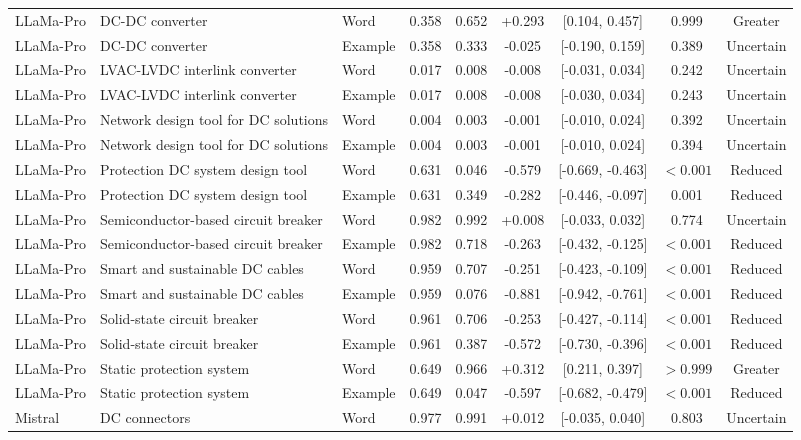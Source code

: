 \begin{landscape}
\begin{longtable}{lllcccccc}
LLaMa-Pro & DC-DC converter & Word & 0.358 & 0.652 & +0.293 & [0.104, 0.457] & 0.999 & Greater \\
LLaMa-Pro & DC-DC converter & Example & 0.358 & 0.333 & -0.025 & [-0.190, 0.159] & 0.389 & Uncertain \\
LLaMa-Pro & LVAC-LVDC interlink converter & Word & 0.017 & 0.008 & -0.008 & [-0.031, 0.034] & 0.242 & Uncertain \\
LLaMa-Pro & LVAC-LVDC interlink converter & Example & 0.017 & 0.008 & -0.008 & [-0.030, 0.034] & 0.243 & Uncertain \\
LLaMa-Pro & Network design tool for DC solutions & Word & 0.004 & 0.003 & -0.001 & [-0.010, 0.024] & 0.392 & Uncertain \\
LLaMa-Pro & Network design tool for DC solutions & Example & 0.004 & 0.003 & -0.001 & [-0.010, 0.024] & 0.394 & Uncertain \\
LLaMa-Pro & Protection DC system design tool & Word & 0.631 & 0.046 & -0.579 & [-0.669, -0.463] & $<0.001$ & Reduced \\
LLaMa-Pro & Protection DC system design tool & Example & 0.631 & 0.349 & -0.282 & [-0.446, -0.097] & 0.001 & Reduced \\
LLaMa-Pro & Semiconductor-based circuit breaker & Word & 0.982 & 0.992 & +0.008 & [-0.033, 0.032] & 0.774 & Uncertain \\
LLaMa-Pro & Semiconductor-based circuit breaker & Example & 0.982 & 0.718 & -0.263 & [-0.432, -0.125] & $<0.001$ & Reduced \\
LLaMa-Pro & Smart and sustainable DC cables & Word & 0.959 & 0.707 & -0.251 & [-0.423, -0.109] & $<0.001$ & Reduced \\
LLaMa-Pro & Smart and sustainable DC cables & Example & 0.959 & 0.076 & -0.881 & [-0.942, -0.761] & $<0.001$ & Reduced \\
LLaMa-Pro & Solid-state circuit breaker & Word & 0.961 & 0.706 & -0.253 & [-0.427, -0.114] & $<0.001$ & Reduced \\
LLaMa-Pro & Solid-state circuit breaker & Example & 0.961 & 0.387 & -0.572 & [-0.730, -0.396] & $<0.001$ & Reduced \\
LLaMa-Pro & Static protection system & Word & 0.649 & 0.966 & +0.312 & [0.211, 0.397] & $>0.999$ & Greater \\
LLaMa-Pro & Static protection system & Example & 0.649 & 0.047 & -0.597 & [-0.682, -0.479] & $<0.001$ & Reduced \\
Mistral & DC connectors & Word & 0.977 & 0.991 & +0.012 & [-0.035, 0.040] & 0.803 & Uncertain \\

\end{longtable}
\end{landscape}
